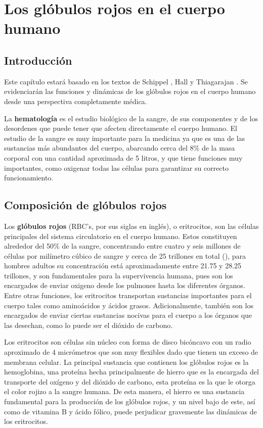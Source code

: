 \chapter{Los glóbulos rojos en el cuerpo humano}\label{chap:RBC}
\section{Introducción}\label{sec:RBC:intro}
Este capítulo estará basado en los textos de Schippel \cite{schippel2023dynamics}, Hall \cite{hall2021guyton} y Thiagarajan \cite{thiagarajan2021red}. Se evidenciarán las funciones y dinámicas de los glóbulos rojos en el cuerpo humano desde una perspectiva completamente médica.

La \textbf{hematología} es el estudio biológico de la sangre, de sus componentes y de los desordenes que puede tener que afecten directamente el cuerpo humano. El estudio de la sangre es muy importante para la medicina ya que es una de las sustancias más abundantes del cuerpo, abarcando cerca del 8\% de la masa corporal con una cantidad aproximada de 5 litros, y que tiene funciones muy importantes, como oxigenar todas las células para garantizar su correcto funcionamiento.

\section{Composición de glóbulos rojos}\label{sec:RBC:Composicion}
Los \textbf{glóbulos rojos} (RBC's, por sus siglas en inglés), o eritrocitos, son las células principales del sistema circulatorio en el cuerpo humano. Estos constituyen alrededor del 50\% de la sangre, concentrando entre cuatro y seis millones de células por milímetro cúbico de sangre y cerca de 25 trillones en total (\cite{enwiki:1217153817}), para hombres adultos su concentración está aproximadamente entre 21.75 y 28.25 trillones, y son fundamentales para la supervivencia humana, pues son los encargados de enviar oxigeno desde los pulmones hasta los diferentes órganos. Entre otras funciones, los eritrocitos transportan sustancias importantes para el cuerpo tales como aminoácidos y ácidos grasos. Adicionalmente, también son los encargados de enviar ciertas sustancias nocivas para el cuerpo a los órganos que las desechan, como lo puede ser el dióxido de carbono.

Los eritrocitos son células sin núcleo con forma de disco bicóncavo con un radio aproximado de 4 micrómetros que son muy flexibles dado que tienen un exceso de membrana celular. La principal sustancia que contienen los glóbulos rojos es la hemoglobina, una proteína hecha principalmente de hierro que es la encargada del transporte del oxígeno y del dióxido de carbono, esta proteína es la que le otorga el color rojizo a la sangre humana. De esta manera, el hierro es una sustancia fundamental para la producción de los glóbulos rojos, y un nivel bajo de este, así como de vitamina B y ácido fólico, puede perjudicar gravemente las dinámicas de los eritrocitos.

